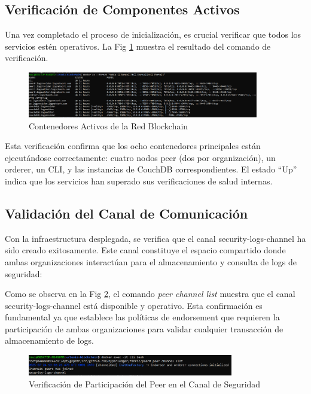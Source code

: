 \subsection{Verificación de Componentes Activos}
Una vez completado el proceso de inicialización, es crucial verificar que todos los servicios estén operativos. La Fig \ref{fig:docker_ps} muestra el resultado del comando de verificación.
\begin{figure}[H]
    \centering
    \includegraphics[width=0.9\textwidth]{figuras/docker_ps.png}
    \caption{Contenedores Activos de la Red Blockchain}
    \label{fig:docker_ps}
\end{figure}

Esta verificación confirma que los ocho contenedores principales están ejecutándose correctamente: cuatro nodos peer (dos por organización), un orderer, un CLI, y las instancias de CouchDB correspondientes. El estado “Up” indica que los servicios han superado sus verificaciones de salud internas.

\subsection{Validación del Canal de Comunicación}
Con la infraestructura desplegada, se verifica que el canal security-logs-channel ha sido creado exitosamente. Este canal constituye el espacio compartido donde ambas organizaciones interactúan para el almacenamiento y consulta de logs de seguridad:

Como se observa en la Fig \ref{fig:canal_creado}, el comando \textit{peer channel list} muestra que el canal security-logs-channel está disponible y operativo. Esta confirmación es fundamental ya que establece las políticas de endorsement que requieren la participación de ambas organizaciones para validar cualquier transacción de almacenamiento de logs.
\begin{figure}[H]
    \centering
    \includegraphics[width=0.8\textwidth]{figuras/canal_creado.png}
    \caption{Verificación de Participación del Peer en el Canal de Seguridad}
    \label{fig:canal_creado}
\end{figure}

